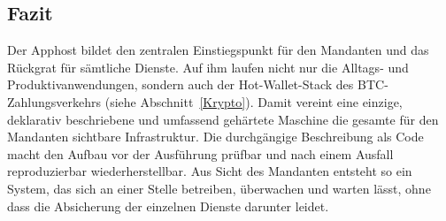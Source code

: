 \subsection{Fazit}
Der Apphost bildet den zentralen Einstiegspunkt für den Mandanten und das
Rückgrat für sämtliche Dienste. Auf ihm laufen nicht nur die Alltags- und
Produktivanwendungen, sondern auch der Hot-Wallet-Stack des
\ac{BTC}-Zahlungsverkehrs (siehe Abschnitt~\ref{Krypto}). Damit vereint eine einzige,
deklarativ beschriebene und umfassend gehärtete Maschine die gesamte für den
Mandanten sichtbare Infrastruktur. Die durchgängige Beschreibung als Code
macht den Aufbau vor der Ausführung prüfbar und nach einem Ausfall
reproduzierbar wiederherstellbar. Aus Sicht des Mandanten entsteht so ein
System, das sich an einer Stelle betreiben, überwachen und warten lässt, ohne
dass die Absicherung der einzelnen Dienste darunter leidet.